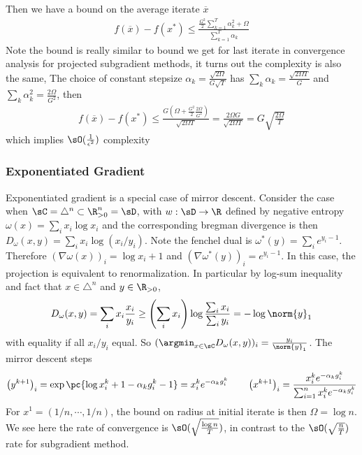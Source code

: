 \documentclass[../summary.tex]{subfiles}
\begin{document}
Then we have a bound on the average iterate $\overline{x}$
\begin{align*}
    f(\overline{x}) - f(x^*)
        \leq \frac{\frac{G^2}{2} \sum_{k=1}^T \alpha_k^2 + \Omega}{ \sum_{k=1}^T \alpha_k }
\end{align*}
Note the bound is really similar to bound we get for last iterate in convergence analysis for projected subgradient methods, it turns out the complexity is also the same, The choice of constant stepsize $\alpha_k = \frac{\sqrt{2\Omega}}{G\sqrt{T}}$ has $\sum_k \alpha_k = \frac{\sqrt{2\Omega T}}{G}$ and $\sum_k \alpha_k^2 = \frac{2\Omega}{G^2}$, then
\begin{align*}
    f(\overline{x}) - f(x^*)
        \leq \frac{ G(\Omega + \frac{G^2}{2}\frac{2\Omega}{G^2}) }{ \sqrt{2\Omega T} } 
        = \frac{2\Omega G}{\sqrt{2\Omega T}}
        = G \sqrt{\frac{2\Omega}{T}}
\end{align*}
which implies $\sO(\frac{1}{\epsilon^2})$ complexity


\subsubsection{Exponentiated Gradient}

Exponentiated gradient is a special case of mirror descent. Consider the case when $\sC = \triangle^n \subset \R_{>0}^n = \sD$, with $w:\sD\to\R$ defined by negative entropy $\omega(x) = \sum_i x_i \log x_i$ and the corresponding bregman divergence is then $D_{\omega}(x,y) = \sum_i x_i \log (x_i/y_i)$. Note the fenchel dual is $\omega^*(y) = \sum_i e^{y_i-1}$. Therefore $(\nabla \omega(x))_i = \log x_i + 1$ and $(\nabla \omega^*(y))_i = e^{y_i-1}$. In this case, the projection is equivalent to renormalization. In particular by log-sum inequality and fact that $x\in\triangle^n$ and $y\in\R_{> 0}$, 
\begin{align*}
    D_{\omega}(x,y)
        = \sum_i x_i \frac{x_i}{y_i}
        \geq \left(\sum_i x_i\right) \log \frac{\sum_i x_i}{\sum_i y_i}  = -\log \norm{y}_1
\end{align*}
with equality if all $x_i/y_i$ equal. So $(\argmin_{x\in\sC} D_{\omega}(x,y))_i = \frac{y_i}{\norm{y}_1}$. The mirror descent steps
\begin{align*}
    \left(y^{k+1}\right)_i
        = \exp\pc{
            \log x^k_i + 1 - \alpha_k g^k_i - 1
        }
        = x^k_i e^{-\alpha_k g^k_i}
        \qquad 
    \left( x^{k+1} \right)_i
        = \frac{x^k_i e^{-\alpha_k g^k_i}}{\sum_{i=1}^n x^k_i e^{-\alpha_k g^k_i}}
\end{align*}
For $x^1 = (1/n,\cdots,1/n)$, the bound on radius at initial iterate is then $\Omega = \log n$. We see here the rate of convergence is $\sO(\sqrt{\frac{\log n}{T}})$, in contrast to the $\sO(\sqrt{\frac{n}{T}})$ rate for subgradient method.
\end{document}
